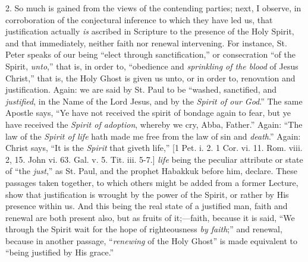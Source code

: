 2. So much is gained from the views of the contending parties;
next, I observe, in corroboration of the conjectural inference to
which they have led us, that justification actually \emph{is} ascribed
in Scripture to the presence of the Holy Spirit, and that immediately,
neither faith nor renewal intervening. For instance, St. Peter speaks
of our being ``elect through sanctification,'' or consecration
``of the Spirit, \emph{unto},'' that is, in order to,
``obedience and \emph{sprinkling of the blood} of Jesus
Christ,'' that is, the Holy Ghost is given us unto, or in order
to, renovation and justification. Again: we are said by St. Paul to be
``washed, sanctified, and \emph{justified}, in the Name of the
Lord Jesus, and by the \emph{Spirit of our God}.'' The same
Apostle says, ``Ye have not received the spirit of bondage again
to fear, but ye have received the \emph{Spirit of adoption}, whereby
we cry, Abba, Father.'' Again: ``The law of the \emph{Spirit of
life} hath made me free from the law of sin and \emph{death}.''
Again: Christ says, ``It is the \emph{Spirit} that giveth
life,'' [1 Pet. i. 2. 1 Cor. vi. 11. Rom. viii. 2, 15. John vi.
63. Gal. v. 5. Tit. iii. 5-7.] \emph{life} being the peculiar attribute or
state of ``the \emph{just},'' as St. Paul, and the prophet
Habakkuk before him, declare. These passages taken together, to which
others might be added from a former Lecture, show that justification
is wrought by the power of the Spirit, or rather by His presence
within us. And this being the real state of a justified man, faith and
renewal are both present also, but as fruits of it;—faith, because
it is said, ``We through the Spirit wait for the hope of
righteousness \emph{by faith};'' and renewal, because in another
passage, ``\emph{renewing} of the Holy Ghost'' is made
equivalent to ``being justified by His grace.''

